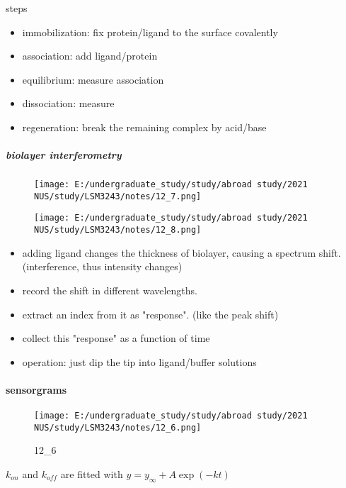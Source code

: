 \documentclass[]{article}
\let\oldparagraph\paragraph
\renewcommand{\paragraph}[1]{\oldparagraph{#1}\mbox{}}
\let\oldsubparagraph\subparagraph
\renewcommand{\subparagraph}[1]{\oldsubparagraph{#1}\mbox{}}
\begin{document}
steps

\begin{itemize}
\item
  immobilization: fix protein/ligand to the surface covalently
\item
  association: add ligand/protein
\item
  equilibrium: measure association
\item
  dissociation: measure
\item
  regeneration: break the remaining complex by acid/base
\end{itemize}

\hypertarget{biolayer-interferometry}{%
\subparagraph{biolayer interferometry}\label{biolayer-interferometry}}

\begin{figure}
\centering
\texttt{[image: E:/undergraduate\_study/study/abroad study/2021 NUS/study/LSM3243/notes/12\_7.png]}
\caption{}
\end{figure}

\begin{figure}
\centering
\texttt{[image: E:/undergraduate\_study/study/abroad study/2021 NUS/study/LSM3243/notes/12\_8.png]}
\caption{}
\end{figure}

\begin{itemize}
\item
  adding ligand changes the thickness of biolayer, causing a spectrum
  shift. (interference, thus intensity changes)
\item
  record the shift in different wavelengths. 
\item
  extract an index from it as "response". (like the peak shift)
\item
  collect this "response" as a function of time
\item
  operation: just dip the tip into ligand/buffer solutions
\end{itemize}

\hypertarget{sensorgrams}{%
\paragraph{sensorgrams}\label{sensorgrams}}

\begin{figure}
\centering
\texttt{[image: E:/undergraduate\_study/study/abroad study/2021 NUS/study/LSM3243/notes/12\_6.png]}
\caption{12\_6}
\end{figure}

\(k_{on}\) and \(k_{off}\) are fitted with \(y=y_\infty+A\exp(-kt)\)
\end{document}
